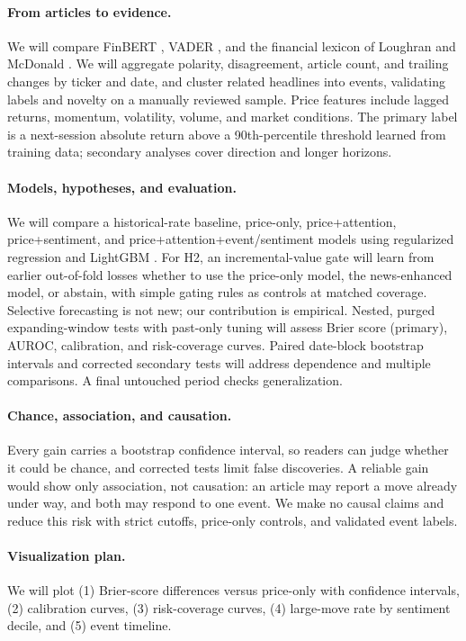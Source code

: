\documentclass{article}
\begin{document}
\paragraph{From articles to evidence.} We will compare FinBERT \citep{araci2019}, VADER \citep{hutto2014}, and the financial lexicon of Loughran and McDonald \citep{loughran2011}. We will aggregate polarity, disagreement, article count, and trailing changes by ticker and date, and cluster related headlines into events, validating labels and novelty on a manually reviewed sample. Price features include lagged returns, momentum, volatility, volume, and market conditions. The primary label is a next-session absolute return above a 90th-percentile threshold learned from training data; secondary analyses cover direction and longer horizons.

\paragraph{Models, hypotheses, and evaluation.} We will compare a historical-rate baseline, price-only, price+attention, price+sentiment, and price+attention+event/sentiment models using regularized regression and LightGBM \citep{ke2017}. For H2, an incremental-value gate will learn from earlier out-of-fold losses whether to use the price-only model, the news-enhanced model, or abstain, with simple gating rules as controls at matched coverage. Selective forecasting is not new; our contribution is empirical. Nested, purged expanding-window tests with past-only tuning will assess Brier score (primary), AUROC, calibration, and risk-coverage curves. Paired date-block bootstrap intervals and corrected secondary tests will address dependence and multiple comparisons. A final untouched period checks generalization.

\paragraph{Chance, association, and causation.} Every gain carries a bootstrap confidence interval, so readers can judge whether it could be chance, and corrected tests limit false discoveries. A reliable gain would show only association, not causation: an article may report a move already under way, and both may respond to one event. We make no causal claims and reduce this risk with strict cutoffs, price-only controls, and validated event labels.

\paragraph{Visualization plan.} We will plot (1) Brier-score differences versus price-only with confidence intervals, (2) calibration curves, (3) risk-coverage curves, (4) large-move rate by sentiment decile, and (5) event timeline.
\end{document}
